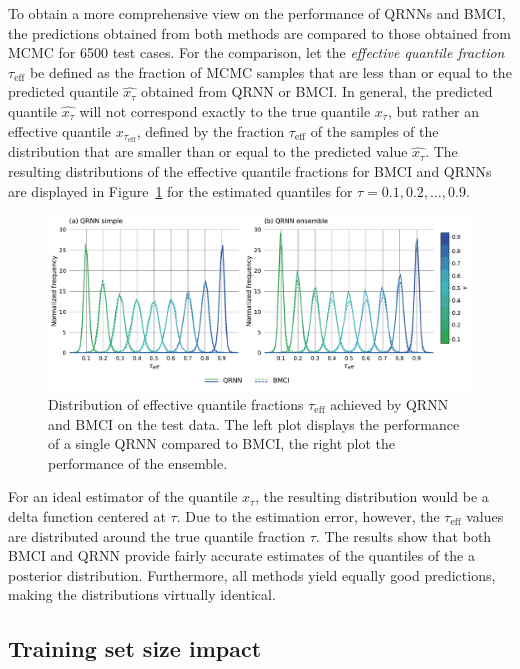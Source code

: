 \documentclass[journal abbreviation, manuscript]{copernicus}
\begin{document}
  To obtain a more comprehensive view on the performance of QRNNs and BMCI,
  the predictions obtained from both methods are compared to those obtained
  from MCMC for 6500 test cases. For the comparison, let the \textit{effective
    quantile fraction} $\tau_{\text{eff}}$ be defined as the fraction of MCMC
  samples that are less than or equal to the predicted quantile
  $\widehat{x_\tau}$ obtained from QRNN or BMCI. In general, the predicted
  quantile $\widehat{x_\tau}$ will not correspond exactly to the true quantile
  $x_\tau$, but rather an effective quantile $x_{\tau_\text{eff}}$, defined by
  the fraction $\tau_\text{eff}$ of the samples of the distribution that are
  smaller than or equal to the predicted value $\widehat{x_\tau}$. The
  resulting distributions of the effective quantile fractions for BMCI and
  QRNNs are displayed in Figure~\ref{fig:quantile_fractions} for the estimated
  quantiles for $\tau = 0.1, 0.2, \ldots, 0.9$.

  \begin{figure}[hbpt!]
    \centering
    \includegraphics[width = 0.8\linewidth]{../plots/fig05}
    \caption{Distribution of effective quantile fractions $\tau_\text{eff}$ achieved by
      QRNN and BMCI on the test data. The left plot displays the performance of a
      single QRNN compared to BMCI, the right plot the performance of the ensemble.}
    \label{fig:quantile_fractions}
  \end{figure}

  For an ideal estimator of the quantile $x_\tau$, the resulting distribution
  would be a delta function centered at $\tau$. Due to the estimation error,
  however, the $\tau_{\text{eff}}$ values are distributed around the true quantile
  fraction $\tau$. The results show that both BMCI and QRNN provide fairly
  accurate estimates of the quantiles of the a posterior distribution. Furthermore,
  all methods  yield equally good predictions, making the distributions virtually
  identical.

\subsection{Training set size impact}
\end{document}
